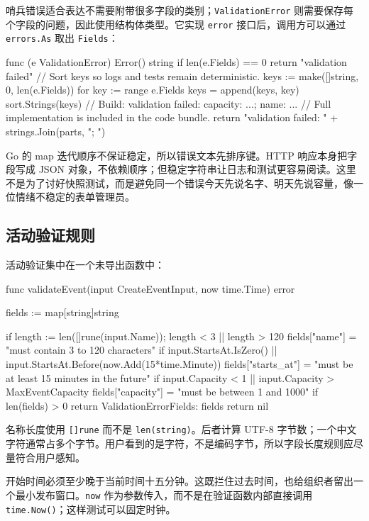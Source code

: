 哨兵错误适合表达不需要附带很多字段的类别；\texttt{ValidationError} 则需要保存每个字段的问题，因此使用结构体类型。它实现 \texttt{error} 接口后，调用方可以通过 \texttt{errors.As} 取出 \texttt{Fields}：

\begin{gocode}[]
func (e ValidationError) Error() string {
    if len(e.Fields) == 0 {
        return "validation failed"
    }
    // Sort keys so logs and tests remain deterministic.
    keys := make([]string, 0, len(e.Fields))
    for key := range e.Fields {
        keys = append(keys, key)
    }
    sort.Strings(keys)
    // Build: validation failed: capacity: ...; name: ...
    // Full implementation is included in the code bundle.
    return "validation failed: " + strings.Join(parts, "; ")
}
\end{gocode}

Go 的 map 迭代顺序不保证稳定，所以错误文本先排序键。HTTP 响应本身把字段写成 JSON 对象，不依赖顺序；但稳定字符串让日志和测试更容易阅读。这里不是为了讨好快照测试，而是避免同一个错误今天先说名字、明天先说容量，像一位情绪不稳定的表单管理员。

\subsection{活动验证规则}

活动验证集中在一个未导出函数中：

\begin{gocode}[title={代码清单 12.13 \texttt{service.go}：验证活动输入}]
func validateEvent(input CreateEventInput, now time.Time) error {
    fields := map[string]string{}

    if length := len([]rune(input.Name)); length < 3 || length > 120 {
        fields["name"] = "must contain 3 to 120 characters"
    }
    if input.StartsAt.IsZero() ||
        input.StartsAt.Before(now.Add(15*time.Minute)) {
        fields["starts_at"] = "must be at least 15 minutes in the future"
    }
    if input.Capacity < 1 || input.Capacity > MaxEventCapacity {
        fields["capacity"] = "must be between 1 and 1000"
    }
    if len(fields) > 0 {
        return ValidationError{Fields: fields}
    }
    return nil
}
\end{gocode}

名称长度使用 \texttt{[]rune} 而不是 \texttt{len(string)}。后者计算 UTF-8 字节数；一个中文字符通常占多个字节。用户看到的是字符，不是编码字节，所以字段长度规则应尽量符合用户感知。

开始时间必须至少晚于当前时间十五分钟。这既拦住过去时间，也给组织者留出一个最小发布窗口。\texttt{now} 作为参数传入，而不是在验证函数内部直接调用 \texttt{time.Now()}；这样测试可以固定时钟。

